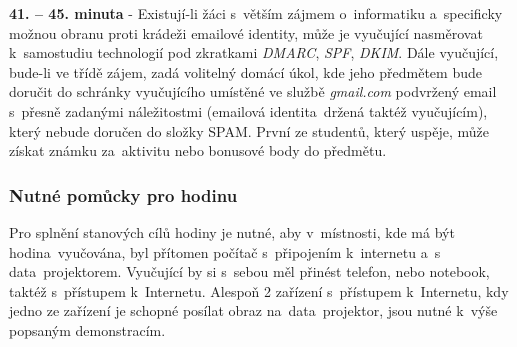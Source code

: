 \documentclass[a4paper, 12pt]{article}
\begin{document}
\textbf{41. -- 45. minuta} - Existují-li žáci s~větším zájmem o~informatiku a~specificky možnou obranu proti krádeži emailové identity, může je vyučující nasměrovat k~samostudiu technologií pod zkratkami \textit{DMARC}, \textit{SPF}, \textit{DKIM}. Dále vyučující, bude-li ve třídě zájem, zadá volitelný domácí úkol, kde jeho předmětem bude doručit do schránky vyučujícího umístěné ve službě \textit{gmail.com} podvržený email s~přesně zadanými náležitostmi (emailová identita~držená taktéž vyučujícím), který nebude doručen do složky SPAM. První ze studentů, který uspěje, může získat známku za~aktivitu nebo bonusové body do předmětu.

\subsubsection{Nutné pomůcky pro hodinu}
Pro splnění stanových cílů hodiny je nutné, aby v~místnosti, kde má být hodina~vyučována, byl přítomen počítač s~připojením k~internetu a~s data~projektorem. Vyučující by si s~sebou měl přinést telefon, nebo notebook, taktéž s~přístupem k~Internetu. Alespoň 2 zařízení s~přístupem k~Internetu, kdy jedno ze zařízení je schopné posílat obraz na~data~projektor, jsou nutné k~výše popsaným demonstracím.
\end{document}

